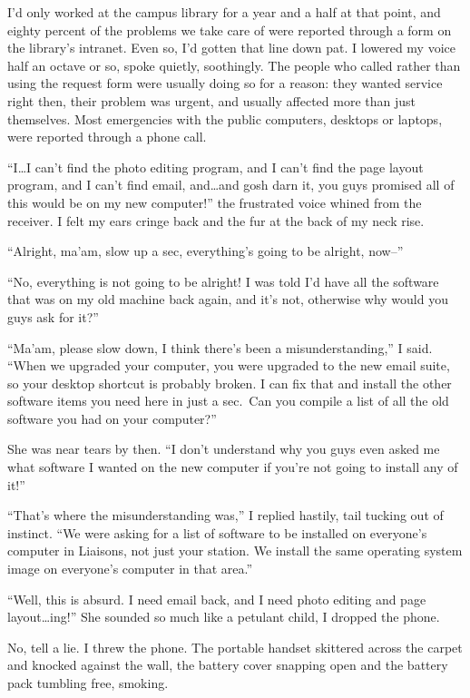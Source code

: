 I'd only worked at the campus library for a year and a half at that point, and eighty percent of the problems we take care of were reported through a form on the library's intranet. Even so, I'd gotten that line down pat. I lowered my voice half an octave or so, spoke quietly, soothingly. The people who called rather than using the request form were usually doing so for a reason: they wanted service right then, their problem was urgent, and usually affected more than just themselves. Most emergencies with the public computers, desktops or laptops, were reported through a phone call.

``I\ldots{}I can't find the photo editing program, and I can't find the page layout program, and I can't find email, and\ldots{}and gosh darn it, you guys promised all of this would be on my new computer!'' the frustrated voice whined from the receiver. I felt my ears cringe back and the fur at the back of my neck rise.

``Alright, ma'am, slow up a sec, everything's going to be alright, now--''

``No, everything is not going to be alright! I was told I'd have all the software that was on my old machine back again, and it's not, otherwise why would you guys ask for it?''

``Ma'am, please slow down, I think there's been a misunderstanding,'' I said. ``When we upgraded your computer, you were upgraded to the new email suite, so your desktop shortcut is probably broken. I can fix that and install the other software items you need here in just a sec.~Can you compile a list of all the old software you had on your computer?''

She was near tears by then. ``I don't understand why you guys even asked me what software I wanted on the new computer if you're not going to install any of it!''

``That's where the misunderstanding was,'' I replied hastily, tail tucking out of instinct. ``We were asking for a list of software to be installed on everyone's computer in Liaisons, not just your station. We install the same operating system image on everyone's computer in that area.''

``Well, this is absurd. I need email back, and I need photo editing and page layout\ldots{}ing!'' She sounded so much like a petulant child, I dropped the phone.

No, tell a lie. I threw the phone. The portable handset skittered across the carpet and knocked against the wall, the battery cover snapping open and the battery pack tumbling free, smoking.

